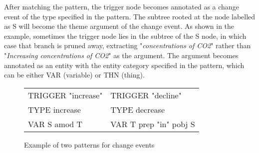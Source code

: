 After matching the pattern, the trigger node becomes annotated as a change event of the type specified in the pattern. The subtree rooted at the node labelled as S will become the theme argument of the change event. As shown in the example, sometimes the trigger node lies in the subtree of the S node, in which case that branch is pruned away, extracting "\emph{concentrations of CO2}" rather than "\emph{Increasing concentrations of CO2}" as the argument. The argument becomes annotated as an entity with the entity category specified in the pattern, which can be either VAR (variable) or THN (thing). 

\begin{figure}
\begin{center}
\begin{tabular}{  l  l  }
TRIGGER "increase"	& TRIGGER "decline" \\
TYPE increase & TYPE decrease \\
VAR S amod T & VAR T prep "in" pobj S \\
\end{tabular}
\end{center}
\caption{Example of two patterns for change events}
\label{pattern_exmpl}
\end{figure}

